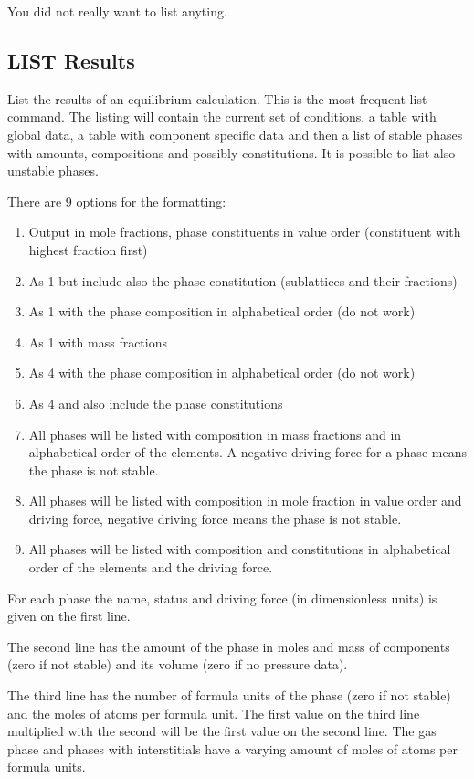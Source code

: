 \documentclass[12pt]{article}
\begin{document}
You did not really want to list anyting.

\subsection{LIST Results}

List the results of an equilibrium calculation.  This is the most
frequent list command.  The listing will contain the current set of
conditions, a table with global data, a table with component specific
data and then a list of stable phases with amounts, compositions and
possibly constitutions.  It is possible to list also unstable phases.

There are 9 options for the formatting:
\begin{enumerate}
\item Output in mole fractions, phase constituents in value order
  (constituent with highest fraction first)
\item As 1 but include also the phase constitution (sublattices and
  their fractions)
\item As 1 with the phase composition in alphabetical order (do not work)
\item As 1 with mass fractions
\item As 4 with the phase composition in alphabetical order (do not work)
\item As 4 and also include the phase constitutions
\item All phases will be listed with composition in mass fractions and
  in alphabetical order of the elements.  A negative driving force for
  a phase means the phase is not stable.
\item All phases will be listed with composition in mole fraction in
  value order and driving force, negative driving force means the
  phase is not stable.
\item All phases will be listed with composition and constitutions in
  alphabetical order of the elements and the driving force.
\end{enumerate}

For each phase the name, status and driving force (in dimensionless
units) is given on the first line.  

The second line has the amount of the phase in moles and mass of
components (zero if not stable) and its volume (zero if no pressure
data).  

The third line has the number of formula units of the phase (zero if
not stable) and the moles of atoms per formula unit.  The first value
on the third line multiplied with the second will be the first value
on the second line.  The gas phase and phases with interstitials have
a varying amount of moles of atoms per formula units.
\end{document}
